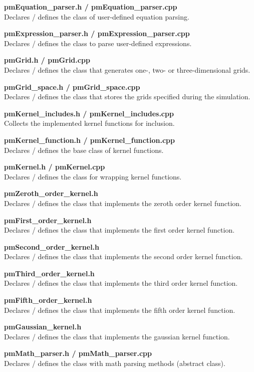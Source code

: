 \documentclass[a4paper,12pt,openany]{book}
\theoremstyle{break}
\begin{document}
\textbf{pmEquation\_parser.h / pmEquation\_parser.cpp} \\
Declares / defines the class of user-defined equation parsing.

\textbf{pmExpression\_parser.h / pmExpression\_parser.cpp} \\
Declares / defines the class to parse user-defined expressions.

\textbf{pmGrid.h / pmGrid.cpp} \\
Declares / defines the class that generates one-, two- or three-dimensional grids.

\textbf{pmGrid\_space.h / pmGrid\_space.cpp} \\
Declares / defines the class that stores the grids specified during the simulation.

\textbf{pmKernel\_includes.h / pmKernel\_includes.cpp} \\
Collects the implemented kernel functions for inclusion.

\textbf{pmKernel\_function.h / pmKernel\_function.cpp} \\
Declares / defines the base class of kernel functions.

\textbf{pmKernel.h / pmKernel.cpp} \\
Declares / defines the class for wrapping kernel functions.

\textbf{pmZeroth\_order\_kernel.h} \\
Declares / defines the class that implements the zeroth order kernel function.

\textbf{pmFirst\_order\_kernel.h} \\
Declares / defines the class that implements the first order kernel function.

\textbf{pmSecond\_order\_kernel.h} \\
Declares / defines the class that implements the second order kernel function.

\textbf{pmThird\_order\_kernel.h} \\
Declares / defines the class that implements the third order kernel function.

\textbf{pmFifth\_order\_kernel.h} \\
Declares / defines the class that implements the fifth order kernel function.

\textbf{pmGaussian\_kernel.h} \\
Declares / defines the class that implements the gaussian kernel function.

\textbf{pmMath\_parser.h / pmMath\_parser.cpp} \\
Declares / defines the class with math parsing methods (abstract class).
\end{document}
